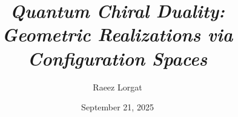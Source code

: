 \documentclass[11pt]{article}
\title{\it{Quantum Chiral Duality:
Geometric Realizations via Configuration Spaces}}
\author{Raeez Lorgat}
\date{September 21, 2025}
\begin{document}
\newcommand{\barBgeom}{\bar{B}_{\text{geom}}}  %
\newcommand{\barBch}{\bar{B}^{\text{ch}}}       %
\newcommand{\Omegach}{\Omega^{\text{ch}}}       %
\newcommand{\ConfigSpace}[1]{\overline{C}_{#1}(X)}  %
\newcommand{\LogForm}[2]{\eta_{#1#2}}           %
\newcommand{\OPEcoeff}[4]{C_{#1#2}^{#3,#4}}    %
\newcommand{\ChirAlg}{\mathsf{ChirAlg}}         %
\newcommand{\dgCoalg}{\mathsf{dgCoalg}}         %




\maketitle
 
\end{document}
